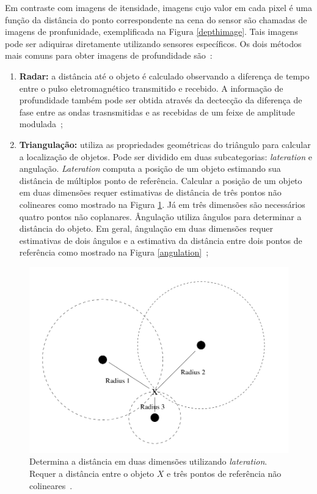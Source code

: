 	Em contraste com imagens de itensidade, imagens cujo valor em cada pixel é uma função da distância do ponto correspondente na cena do sensor são chamadas de imagens de pronfunidade, exemplificada na Figura \ref{depthimage}. Tais imagens pode ser adiquiras diretamente utilizando sensores específicos. Os dois métodos mais comuns para obter imagens de profundidade são~\cite{jain}:

		\begin{enumerate}
			\item \textbf{Radar:} a distância até o objeto é calculado observando a diferença de tempo entre o pulso eletromagnético transmitido e recebido. A informação de profundidade também pode ser obtida através da dectecção da diferença de fase entre as ondas trasnsmitidas e as recebidas de um feixe de amplitude modulada~\cite{jain};
			\item \textbf{Triangulação:} utiliza as propriedades geométricas do triângulo para calcular a localização de objetos. Pode ser dividido em duas subcategorias: \textit{lateration} e angulação. \textit{Lateration} computa a posição de um objeto estimando sua distância de múltiplos ponto de referência. Calcular a posição de um objeto em duas dimensões requer estimativas de distância de três pontos não colineares como mostrado na Figura \ref{lateration}. Já em três dimensões são necessários quatro pontos não coplanares. Ângulação utiliza ângulos para determinar a distância do objeto. Em geral, ângulação em duas dimensões requer estimativas de dois ângulos e a estimativa da distância entre dois pontos de referência como mostrado na Figura \ref{angulation}~\cite{triangulacao};
		\end{enumerate}

		\begin{figure}[hbt]
		\begin{center}
			\includegraphics[scale=0.5]{figuras/2.FundamentacaoTeorica/lateration.png}
		\end{center}
		\caption{Determina a distância em duas dimensões utilizando \textit{lateration}. Requer a distância entre o objeto $\displaystyle X$ e três pontos de referência não colineares~\cite{triangulacao}.}
		\label{lateration}
	\end{figure}

